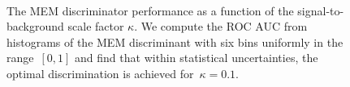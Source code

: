 \begin{figure}[ht]
\begin{centering}
\\
\caption[The MEM discriminator performance as a function of $\kappa$]{The MEM discriminator performance as a function of the signal-to-background scale factor $\kappa$. We compute the ROC AUC from histograms of the MEM discriminant with six bins uniformly in the range~$[0,1]$ and find that within statistical uncertainties, the optimal discrimination is achieved for~$\kappa=0.1$. }
\label{fig:mem_kappa}
\end{centering}
\end{figure}

